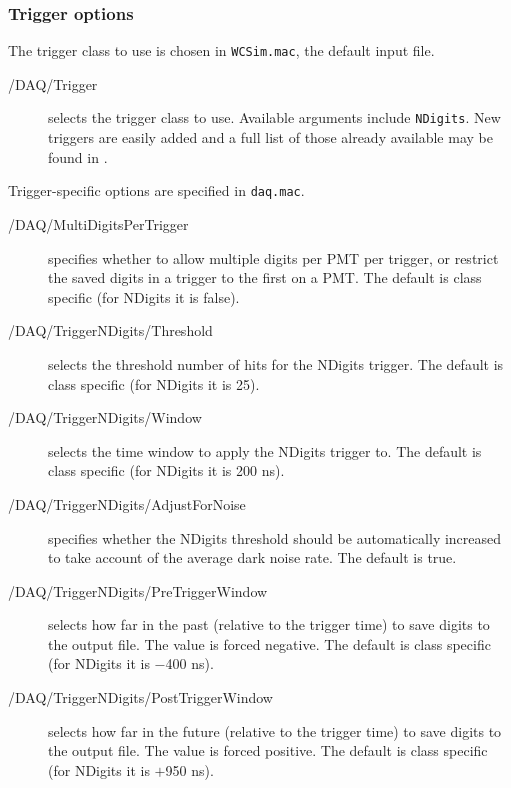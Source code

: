\subsubsection{Trigger options}
The trigger class to use is chosen in \texttt{WCSim.mac}, the default input file.
\begin{description}
\item[/DAQ/Trigger] selects the trigger class to use. Available arguments include \texttt{NDigits}. New triggers are easily added and a full list of those already available may be found in .
\end{description}
Trigger-specific options are specified in \texttt{daq.mac}.
\begin{description}

\item[/DAQ/MultiDigitsPerTrigger] specifies whether to allow multiple digits per PMT per trigger, or restrict the saved digits in a trigger to the first on a PMT. The default is class specific (for NDigits it is false).

\item[/DAQ/TriggerNDigits/Threshold] selects the threshold number of hits for the NDigits trigger. The default is class specific (for NDigits it is 25).
\item[/DAQ/TriggerNDigits/Window] selects the time window to apply the NDigits trigger to. The default is class specific (for NDigits it is 200 ns).
\item[/DAQ/TriggerNDigits/AdjustForNoise] specifies whether the NDigits threshold should be automatically increased to take account of the average dark noise rate. The default is true.
\item[/DAQ/TriggerNDigits/PreTriggerWindow] selects how far in the past (relative to the trigger time) to save digits to the output file. The value is forced negative. The default is class specific (for NDigits it is $-$400 ns). 
\item[/DAQ/TriggerNDigits/PostTriggerWindow] selects how far in the future (relative to the trigger time) to save digits to the output file. The value is forced positive. The default is class specific (for NDigits it is $+$950 ns). 


\end{description}
